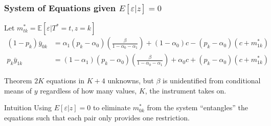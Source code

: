 \documentclass{beamer}
\begin{document}
%
\begin{frame}
  \frametitle{System of Equations given $E[\varepsilon|z]=0$}
  \footnotesize
  Let $m^*_{tk} = \mathbb{E}[\varepsilon|T^*=t,z=k]$
\begin{align*}
  (1 - p_k)\bar{y}_{0k} &=\alpha_1(p_k - \alpha_0)\left(\frac{\beta}{1 - \alpha_0 - \alpha_1}\right) + (1-\alpha_0)c - (p _k -  \alpha_0)(c + m_{1k}^*) \\[1.5ex]
  p_k\bar{y}_{1k} &=(1-\alpha_1)(p_k - \alpha_0)\left(\frac{\beta}{1 - \alpha_0 - \alpha_1}\right) + \alpha_0 c + (p _k -  \alpha_0)(c + m_{1k}^*)
\end{align*}

\begin{alertblock}{Theorem}
  $2K$ equations in $K+4$ unknowns, but $\beta$ is unidentified from conditional means of $y$ regardless of how many values, $K$, the instrument takes on.
\end{alertblock}

\begin{block}{Intuition}
  Using $E[\varepsilon|z]=0$ to eliminate $m_{0k}^*$ from the system ``entangles'' the equations such that each pair only provides one restriction.
\end{block}

\end{frame}
%
\end{document}
